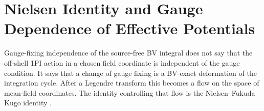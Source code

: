 \section{Nielsen Identity and Gauge Dependence of Effective Potentials}
\label{sec:nielsen-identity-gauge-effective-potential}

Gauge-fixing independence of the source-free BV integral does not say that the
off-shell 1PI action in a chosen field coordinate is independent of the gauge
condition.  It says that a change of gauge fixing is a BV-exact deformation of
the integration cycle.  After a Legendre transform this becomes a flow on the
space of mean-field coordinates.  The identity controlling that flow is the
Nielsen--Fukuda--Kugo identity
\cite{Nielsen1975GaugeDependence,FukudaKugo1976GaugeEffectiveAction,
AitchisonFraser1984GaugeEffectivePotential,MetaxasWeinberg1996BubbleGauge}.

